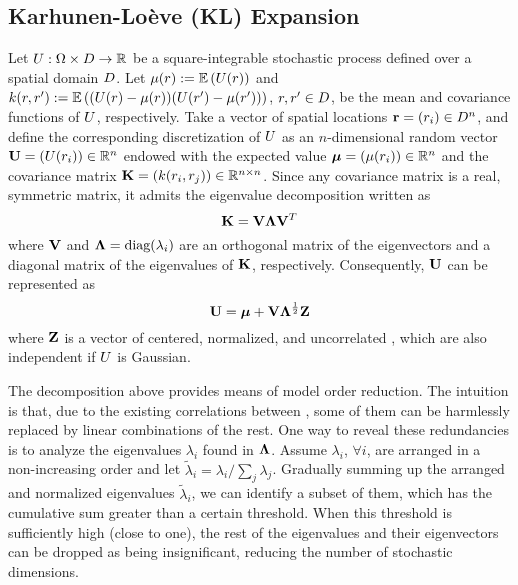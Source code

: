 \subsection{Karhunen-Lo\`{e}ve (KL) Expansion} 
Let $U: \Omega \times D \to \mathbb{R}$ be a square-integrable stochastic process defined over a spatial domain $D$. Let $\fMean{\r} := \E{\U(\r)}$ and $\fCov{\r, \r'} := \E{(\U(\r) - \fMean{\r}) (\U(\r') - \fMean{\r'})}$, $r, r' \in D$, be the mean and covariance functions of $U$, respectively. Take a vector of spatial locations $\mathbf{r} = (r_i) \in D^n$, and define the corresponding discretization of $U$ as an $n$-dimensional random vector $\mathbf{U} = (U(r_i)) \in \mathbb{R}^n$ endowed with the expected value $\vMean = (\fMean{\r_i}) \in \real^n$ and the covariance matrix $\mCov = (\fCov{\r_i, \r_j}) \in \real^{n \times n}$. Since any covariance matrix is a real, symmetric matrix, it admits the eigenvalue decomposition \cite{press2007} written as
\[
  \mathbf{K} = \mathbf{V} \mathbf{\Lambda} \mathbf{V}^T
\]
where $\mathbf{V}$ and $\mathbf{\Lambda} = \text{diag}(\lambda_i)$ are an orthogonal matrix of the eigenvectors and a diagonal matrix of the eigenvalues of $\mathbf{K}$, respectively. Consequently, $\mathbf{U}$ can be represented as
\[
  \mathbf{U} = \boldsymbol\mu + \mathbf{V} \mathbf{\Lambda}^\frac{1}{2} \mathbf{Z}
\]
where $\mathbf{Z}$ is a vector of centered, normalized, and uncorrelated \rvs, which are also independent if $U$ is Gaussian.

The decomposition above provides means of model order reduction. The intuition is that, due to the existing correlations between \rvs, some of them can be harmlessly replaced by linear combinations of the rest. One way to reveal these redundancies is to analyze the eigenvalues $\lambda_i$ found in $\mathbf{\Lambda}$. Assume $\lambda_i$, $\forall i$, are arranged in a non-increasing order and let $\tilde{\lambda}_i = \lambda_i / \sum_j \lambda_j$. Gradually summing up the arranged and normalized eigenvalues $\tilde{\lambda}_i$, we can identify a subset of them, which has the cumulative sum greater than a certain threshold. When this threshold is sufficiently high (close to one), the rest of the eigenvalues and their eigenvectors can be dropped as being insignificant, reducing the number of stochastic dimensions.

